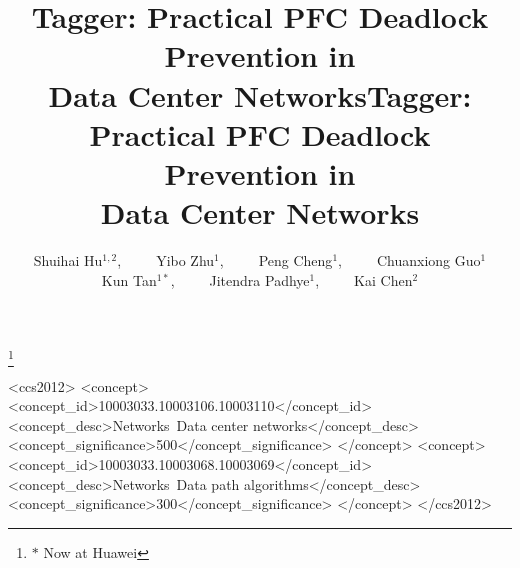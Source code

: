\documentclass[sigconf]{acmart}
\newcommand{\sysname}{Tagger}
\begin{document}
	
	
	
	
	\title{\sysname{}: Practical PFC Deadlock Prevention in\\Data Center Networks}
	
	
	\author{Shuihai Hu$^{1,2}$,~~~~~Yibo Zhu$^{1}$,~~~~~Peng Cheng$^{1}$,~~~~~Chuanxiong Guo$^{1}$\\Kun Tan$^{1*}$,~~~~~Jitendra Padhye$^{1}$,~~~~~Kai Chen$^{2}$ }



   \thanks{$\ast$ Now at Huawei}




\title[\sysname{}: Practical PFC Deadlock Prevention in DCNs]{\sysname{}: Practical PFC Deadlock Prevention in\\Data Center Networks}
\renewcommand{\shortauthors}{S. Hu et al.}



%




%

\begin{CCSXML}
	<ccs2012>
	<concept>
	<concept_id>10003033.10003106.10003110</concept_id>
	<concept_desc>Networks~Data center networks</concept_desc>
	<concept_significance>500</concept_significance>
	</concept>
	<concept>
	<concept_id>10003033.10003068.10003069</concept_id>
	<concept_desc>Networks~Data path algorithms</concept_desc>
	<concept_significance>300</concept_significance>
	</concept>
	</ccs2012>
\end{CCSXML}
\end{document}
